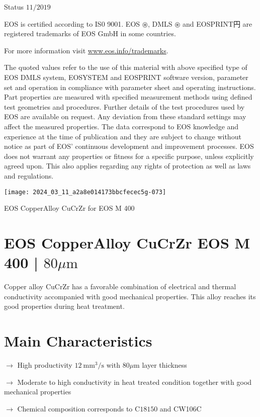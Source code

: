 \documentclass[10pt]{article}
\begin{document}
Status $11 / 2019$

EOS is certified according to IS0 9001. EOS $\circledast$, DMLS $\circledast$ and EOSPRINT円 are registered trademarks of EOS GmbH in some countries.

For more information visit \href{http://www.eos.info/trademarks}{www.eos.info/trademarks}.

The quoted values refer to the use of this material with above specified type of EOS DMLS system, EOSYSTEM and EOSPRINT software version, parameter set and operation in compliance with parameter sheet and operating instructions. Part properties are measured with specified measurement methods using defined test geometries and procedures. Further details of the test procedures used by EOS are available on request. Any deviation from these standard settings may affect the measured properties. The data correspond to EOS knowledge and experience at the time of publication and they are subject to change without notice as part of EOS' continuous development and improvement processes. EOS does not warrant any properties or fitness for a specific purpose, unless explicitly agreed upon. This also applies regarding any rights of protection as well as laws and regulations.

\begin{center}
\texttt{[image: 2024\_03\_11\_a2a8e014173bbcfecec5g-073]}
\end{center}

EOS CopperAlloy CuCrZr for EOS M 400

\section*{EOS CopperAlloy CuCrZr EOS M 400 | $80 \mu \mathrm{m}$}
Copper alloy CuCrZr has a favorable combination of electrical and thermal conductivity accompanied with good mechanical properties. This alloy reaches its good properties during heat treatment.

\section*{Main Characteristics}
$\longrightarrow$ High productivity $12 \mathrm{~mm}^{3} / \mathrm{s}$ with $80 \mu \mathrm{m}$ layer thickness

$\longrightarrow$ Moderate to high conductivity in heat treated condition together with good mechanical properties

$\longrightarrow$ Chemical composition corresponds to $\mathrm{C} 18150$ and CW106C
\end{document}
